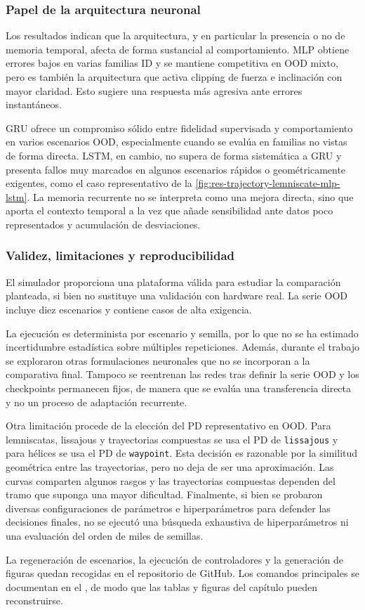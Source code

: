 \subsubsection*{Papel de la arquitectura neuronal}

Los resultados indican que la arquitectura, y en particular la presencia o no de
memoria temporal, afecta de forma sustancial al comportamiento. MLP obtiene
errores bajos en varias familias ID y se mantiene competitiva en OOD mixto,
pero es también la arquitectura que activa clipping de fuerza e
inclinación con mayor claridad. Esto sugiere una respuesta más agresiva ante
errores instantáneos.

GRU ofrece un compromiso sólido entre fidelidad supervisada y comportamiento en
varios escenarios OOD, especialmente cuando se evalúa en familias no vistas de forma
directa. LSTM, en cambio, no supera de forma sistemática a GRU y presenta fallos
muy marcados en algunos escenarios rápidos o geométricamente exigentes, como el
caso representativo de la \autoref{fig:res-trajectory-lemniscate-mlp-lstm}. La
memoria recurrente no se interpreta como una mejora directa, sino que aporta
el contexto temporal a la vez que añade sensibilidad ante datos poco representados
y acumulación de desviaciones.

\subsubsection*{Validez, limitaciones y reproducibilidad}

El simulador proporciona una plataforma válida para estudiar la comparación
planteada, si bien no sustituye una validación con hardware real. La serie OOD
incluye diez escenarios y contiene casos de alta exigencia.

La ejecución es determinista por escenario y semilla, por lo que no se ha
estimado incertidumbre estadística sobre múltiples repeticiones. Además, durante
el trabajo se exploraron otras formulaciones neuronales que no se incorporan a
la comparativa final. Tampoco se reentrenan las redes tras definir la serie OOD y
los checkpoints permanecen fijos, de manera que se evalúa una transferencia directa
y no un proceso de adaptación recurrente. 

Otra limitación procede de la elección del PD representativo en OOD. Para
lemniscatas, lissajous y trayectorias compuestas se usa el PD de
\texttt{lissajous} y para hélices se usa el PD de \texttt{waypoint}. Esta
decisión es razonable por la similitud geométrica entre las trayectorias, pero
no deja de ser una aproximación. Las curvas comparten algunos rasgos y las trayectorias
compuestas dependen del tramo que suponga una mayor dificultad. Finalmente, si bien
se probaron diversas configuraciones de parámetros e hiperparámetros para defender
las decisiones finales, no se ejecutó una búsqueda exhaustiva de hiperparámetros ni
una evaluación del orden de miles de semillas.

La regeneración de escenarios, la ejecución de controladores y la generación de
figuras quedan recogidas en el repositorio de GitHub. Los comandos principales
se documentan en el ,
de modo que las tablas y figuras del capítulo pueden reconstruirse.
